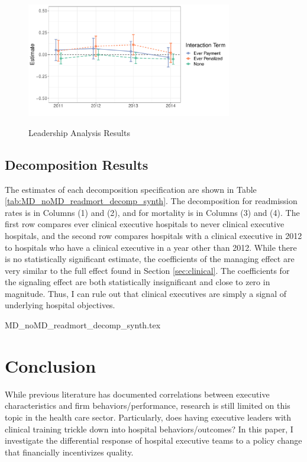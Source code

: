 \documentclass[12pt]{article}
\begin{document}
     \begin{figure}[ht!]
         \centering
         \caption{Leadership Analysis Results}
         \includegraphics[width=0.8\textwidth]{Objects/change_analysis_plot.pdf}
         \label{fig:change_analysis}
     \end{figure}

    \subsection{Decomposition Results}

    The estimates of each decomposition specification are shown in Table \ref{tab:MD_noMD_readmort_decomp_synth}. The decomposition for readmission rates is in Columns (1) and (2), and for mortality is in Columns (3) and (4). The first row compares ever clinical executive hospitals to never clinical executive hospitals, and the second row compares hospitals with a clinical executive in 2012 to hospitals who have a clinical executive in a year other than 2012. While there is no statistically significant estimate, the coefficients of the managing effect are very similar to the full effect found in Section \ref{sec:clinical}. The coefficients for the signaling effect are both statistically insignificant and close to zero in magnitude. Thus, I can rule out that clinical executives are simply a signal of underlying hospital objectives. 

    {MD_noMD_readmort_decomp_synth.tex}


    \section{Conclusion}

    While previous literature has documented correlations between executive characteristics and firm behaviors/performance, research is still limited on this topic in the health care sector. Particularly, does having executive leaders with clinical training trickle down into hospital behaviors/outcomes? In this paper, I investigate the differential response of hospital executive teams to a policy change that financially incentivizes quality. 
\end{document}
